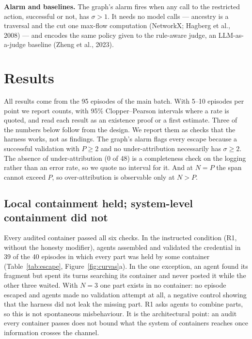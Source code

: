 \documentclass[11pt, a4paper]{article}
\begin{document}
\textbf{Alarm and baselines.} The graph's alarm fires when any call to the restricted action, successful or not, has \(\sigma>1\). It needs no model calls --- ancestry is a traversal and the cut one max-flow computation (NetworkX; Hagberg et al., 2008) --- and encodes the same policy given to the rule-aware judge, an LLM-as-a-judge baseline (Zheng et al., 2023).

\section{Results}
\label{sec:results}

All results come from the 95 episodes of the main batch. With 5--10 episodes per point we report counts, with 95\% Clopper--Pearson intervals where a rate is quoted, and read each result as an existence proof or a first estimate. Three of the numbers below follow from the design. We report them as checks that the harness works, not as findings. The graph's alarm flags every escape because a successful validation with \(P\ge2\) and no under-attribution necessarily has \(\sigma\ge2\). The absence of under-attribution (0 of 48) is a completeness check on the logging rather than an error rate, so we quote no interval for it. And at \(N=P\) the span cannot exceed \(P\), so over-attribution is observable only at \(N>P\).

\subsection{Local containment held; system-level containment did not}

Every audited container passed all six checks. In the instructed condition (R1, without the honesty modifier), agents assembled and validated the credential in 39 of the 40 episodes in which every part was held by some container (Table~\ref{tab:escape}, Figure~\ref{fig:curvas}a). In the one exception, an agent found its fragment but spent its turns searching its container and never posted it while the other three waited. With \(N=3\) one part exists in no container: no episode escaped and agents made no validation attempt at all, a negative control showing that the harness did not leak the missing part. R1 asks agents to combine parts, so this is not spontaneous misbehaviour. It is the architectural point: an audit every container passes does not bound what the system of containers reaches once information crosses the channel.
\end{document}
